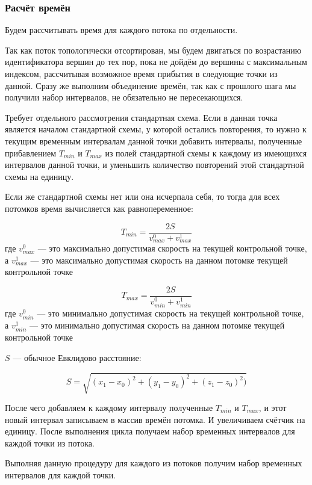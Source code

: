 \documentclass[12pt, a4 paper]{article}
\theoremstyle{plain}
\begin{document}


\subsubsection{Расчёт времён}

Будем рассчитывать время для каждого потока по отдельности.

Так как поток топологически отсортирован, мы будем двигаться по возрастанию идентификатора вершин до тех пор, пока не дойдём до вершины с максимальным индексом, рассчитывая возможное время прибытия в следующие точки из данной. Сразу же выполним объединение времён, так как с прошлого шага мы получили набор интервалов, не обязательно не пересекающихся. 

Требует отдельного рассмотрения стандартная схема. Если в данная точка является началом стандартной схемы, у которой остались повторения, то нужно к текущим временным интервалам данной точки добавить интервалы, полученные прибавлением $T_{min}$ и $T_{max}$ из полей стандартной схемы к каждому из имеющихся интервалов данной точки, и уменьшить количество повторений этой стандартной схемы на единицу. 

Если же стандартной схемы нет или она исчерпала себя, то тогда для всех потомков время вычисляется как равнопеременное:

$$
T_{min} = \frac{2S}{v_{max}^0 + v_{max}^1}
$$
где $v_{max}^0$ --- это максимально допустимая скорость на текущей контрольной точке, а $v_{max}^1$ --- это максимально допустимая скорость на данном потомке текущей контрольной точке

$$
T_{max} = \frac{2S}{v_{min}^0 + v_{min}^1}
$$
где $v_{min}^0$ --- это минимально допустимая скорость на текущей контрольной точке, а $v_{min}^1$ --- это минимально допустимая скорость на данном потомке текущей контрольной точке

$S$ --- обычное Евклидово расстояние:

$$
S = \sqrt{(x_1 - x_0)^2 + (y_1 - y_0)^2 + (z_1 - z_0)^2)}
$$


После чего добавляем к каждому интервалу полученные $T_{min}$ и $T_{max}$, и этот новый интервал записываем в массив времён потомка. И увеличиваем счётчик на единицу. После выполнения цикла получаем набор временных интервалов для каждой точки из потока.

Выполняя данную процедуру для каждого из потоков получим набор временных интервалов для каждой точки.
\end{document}
